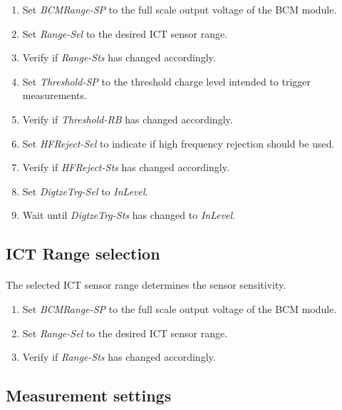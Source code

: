\documentclass[openany]{article}
\begin{document}
			\begin{enumerate}
			\item Set \emph{BCMRange-SP} to the full scale output voltage of the BCM module.
			\item Set \emph{Range-Sel} to the desired ICT sensor range.
			\item Verify if \emph{Range-Sts} has changed accordingly.
			\item Set \emph{Threshold-SP} to the threshold charge level intended to trigger measurements.
			\item Verify if \emph{Threshold-RB} has changed accordingly.
			\item Set \emph{HFReject-Sel} to indicate if high frequency rejection should be used.
			\item Verify if \emph{HFReject-Sts} has changed accordingly.
			\item Set \emph{DigtzeTrg-Sel} to \emph{InLevel}.
			\item Wait until \emph{DigtzeTrg-Sts} has changed to \emph{InLevel}.
			\end{enumerate}

	\subsection{ICT Range selection}

		\paragraph{} The selected ICT sensor range determines the sensor sensitivity.

			\begin{enumerate}
			\item Set \emph{BCMRange-SP} to the full scale output voltage of the BCM module.
			\item Set \emph{Range-Sel} to the desired ICT sensor range.
			\item Verify if \emph{Range-Sts} has changed accordingly.
			\end{enumerate}

	\subsection{Measurement settings}
\end{document}
